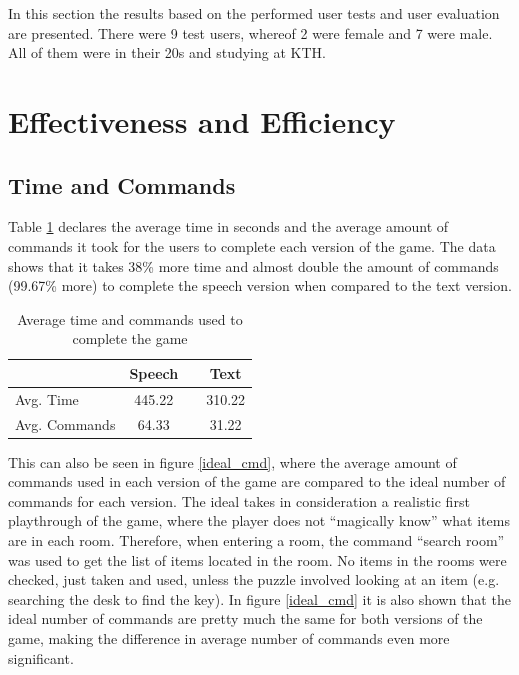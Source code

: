 In this section the results based on the performed user tests and user evaluation are presented. There were 9 test users, whereof 2 were female and 7 were male. All of them were in their 20s and studying at KTH.

\section{Effectiveness and Efficiency}

\subsection{Time and Commands}
Table \ref{fig:avg_data} declares the average time in seconds and the average amount of commands it took for the users to complete each version of the game. The data shows that it takes 38\% more time and almost double the amount of commands (99.67\% more) to complete the speech version when compared to the text version.

\begin{table}[ht]
  \centering
  \begin{tabular}{l|ccc}
    \toprule
     & Speech &   & Text\\
    \midrule
    Avg. Time & 445.22 &   & 310.22\\
    Avg. Commands & 64.33 &   & 31.22\\
    \bottomrule
  \end{tabular}
  \caption{Average time and commands used to complete the game}\label{fig:avg_data}
\end{table}

This can also be seen in figure \ref{ideal_cmd}, where the average amount of commands used in each version of the game are compared to the ideal number of commands for each version. The ideal takes in consideration a realistic first playthrough of the game, where the player does not ``magically know'' what items are in each room. Therefore, when entering a room, the command “search room” was used to get the list of items located in the room. No items in the rooms were checked, just taken and used, unless the puzzle involved looking at an item (e.g. searching the desk to find the key). In figure \ref{ideal_cmd} it is also shown that the ideal number of commands are pretty much the same for both versions of the game, making the difference in average number of commands even more significant.

